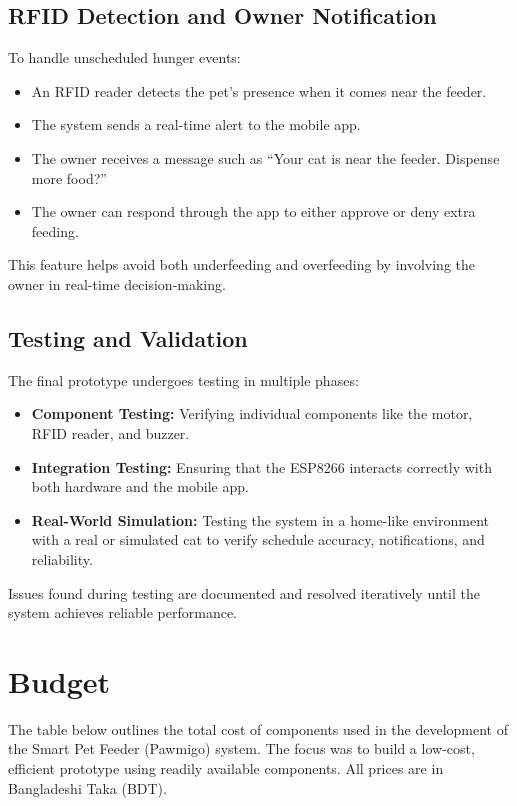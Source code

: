 \documentclass[10pt,a4paper]{extarticle}
\begin{document}
\subsection{RFID Detection and Owner Notification}

To handle unscheduled hunger events:
\begin{itemize}[parsep=0em]
    \item An RFID reader detects the pet's presence when it comes near the feeder.
    \item The system sends a real-time alert to the mobile app.
    \item The owner receives a message such as “Your cat is near the feeder. Dispense more food?”
    \item The owner can respond through the app to either approve or deny extra feeding.
\end{itemize}

This feature helps avoid both underfeeding and overfeeding by involving the owner in real-time decision-making.

\subsection{Testing and Validation}
The final prototype undergoes testing in multiple phases:

\begin{itemize}
    \item \textbf{Component Testing:} Verifying individual components like the motor, RFID reader, and buzzer.
    \item \textbf{Integration Testing:} Ensuring that the ESP8266 interacts correctly with both hardware and the mobile app.
    \item \textbf{Real-World Simulation:} Testing the system in a home-like environment with a real or simulated cat to verify schedule accuracy, notifications, and reliability.
\end{itemize}

Issues found during testing are documented and resolved iteratively until the system achieves reliable performance.

\pagebreak
\section{Budget}

The table below outlines the total cost of components used in the development of the Smart Pet Feeder (Pawmigo) system. The focus was to build a low-cost, efficient prototype using readily available components. All prices are in Bangladeshi Taka (BDT).
\end{document}
